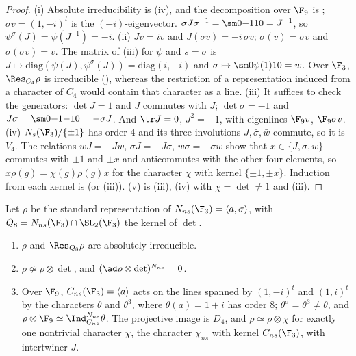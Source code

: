 \begin{proof}
(i) Absolute irreducibility is (iv), and the decomposition over $\F_9$ is ; $\sigma v=(1,-i)^t$ is
the $(-i)$-eigenvector. $\sigma J\sigma^{-1}=\sm0{-1}10=J^{-1}$, so $\psi^\sigma(J)=\psi(J^{-1})=-i$.
(ii) $Jv=iv$ and $J(\sigma v)=-i\,\sigma v$; $\sigma(v)=\sigma v$ and $\sigma(\sigma v)=v$. The matrix of (iii) for $\psi$ and $s=\sigma$ is
$J\mapsto\mathrm{diag}(\psi(J),\psi^\sigma(J))=\mathrm{diag}(i,-i)$ and $\sigma\mapsto\sm0{\psi(1)}10=w$. Over $\F_3$, $\Res_{C_4}\rho$ is irreducible (), whereas
the restriction of a representation induced from a character of $C_4$ would contain that character as a line.
(iii) It suffices to check the generators: $\det J=1$ and $J$ commutes with $J$; $\det\sigma=-1$ and $J\sigma=\sm0{-1}{-1}0=-\sigma J$. And $\tr J=0$, $J^2=-1$, with
eigenlines $\F_9v$, $\F_9\sigma v$.
(iv) $N_s(\F_3)/\{\pm1\}$ has order $4$ and its three involutions $\bar J,\bar\sigma,\bar w$ commute, so it is $V_4$. The relations $wJ=-Jw$, $\sigma J=-J\sigma$,
$w\sigma=-\sigma w$ show that $x\in\{J,\sigma,w\}$ commutes with $\pm1$ and $\pm x$ and anticommutes with the other four elements, so $x\rho(g)=\chi(g)\rho(g)x$ for the
character $\chi$ with kernel $\{\pm1,\pm x\}$. Induction from each kernel is  (or (iii)).
(v) is (iii), (iv) with $\chi=\det\ne1$ and (iii).
\end{proof}

\begin{proposition}[$N_{ns}(\F_3)$]\label{prop:reps:nns3}
Let $\rho$ be the standard representation of $N_{ns}(\F_3)=\langle a,\sigma\rangle$, with $Q_8=N_{ns}(\F_3)\cap\SL_2(\F_3)$ the kernel of $\det$.
\begin{enumerate}[label=(\roman*)]
\item $\rho$ and $\Res_{Q_8}\rho$ are absolutely irreducible.
\item $\rho\not\simeq\rho\otimes\det$, and $(\ad\rho\otimes\det)^{N_{ns}}=0$.
\item Over $\F_9$, $C_{ns}(\F_3)=\langle a\rangle$ acts on the lines spanned by $(1,-i)^t$ and $(1,i)^t$ by the characters $\theta$ and $\theta^3$, where $\theta(a)=1+i$ has order
$8$; $\theta^\sigma=\theta^3\ne\theta$, and $\rho\otimes\F_9\simeq\Ind_{C_{ns}}^{N_{ns}}\theta$. The projective image is $D_4$, and $\rho\simeq\rho\otimes\chi$ for exactly one
nontrivial character $\chi$, the character $\chi_{ns}$ with kernel $C_{ns}(\F_3)$, with intertwiner $J$.
\end{enumerate}
\end{proposition}

